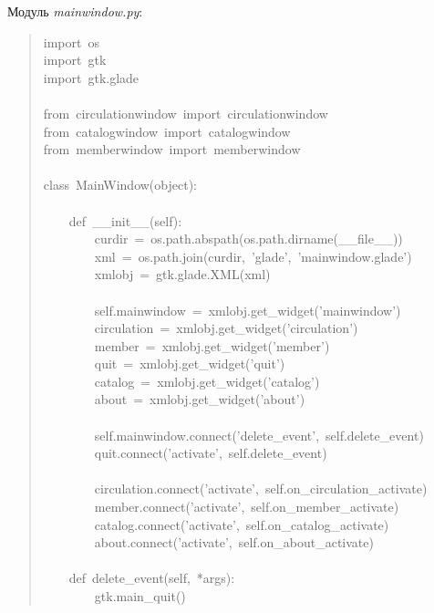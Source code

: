 \documentclass[a4paper,openany,twoside,final]{book}
\providecommand*{\DUroletitlereference}[1]{\textsl{#1}}
\begin{document}
Модуль \DUroletitlereference{mainwindow.py}:

\begin{quote}{\ttfamily \raggedright \noindent
import~os\\
import~gtk\\
import~gtk.glade\\
~\\
from~circulationwindow~import~circulationwindow\\
from~catalogwindow~import~catalogwindow\\
from~memberwindow~import~memberwindow\\
~\\
class~MainWindow(object):\\
~\\
~~~~def~\_\_init\_\_(self):\\
~~~~~~~~curdir~=~os.path.abspath(os.path.dirname(\_\_file\_\_))\\
~~~~~~~~xml~=~os.path.join(curdir,~'glade',~'mainwindow.glade')\\
~~~~~~~~xmlobj~=~gtk.glade.XML(xml)\\
~\\
~~~~~~~~self.mainwindow~=~xmlobj.get\_widget('mainwindow')\\
~~~~~~~~circulation~=~xmlobj.get\_widget('circulation')\\
~~~~~~~~member~=~xmlobj.get\_widget('member')\\
~~~~~~~~quit~=~xmlobj.get\_widget('quit')\\
~~~~~~~~catalog~=~xmlobj.get\_widget('catalog')\\
~~~~~~~~about~=~xmlobj.get\_widget('about')\\
~\\
~~~~~~~~self.mainwindow.connect('delete\_event',~self.delete\_event)\\
~~~~~~~~quit.connect('activate',~self.delete\_event)\\
~\\
~~~~~~~~circulation.connect('activate',~self.on\_circulation\_activate)\\
~~~~~~~~member.connect('activate',~self.on\_member\_activate)\\
~~~~~~~~catalog.connect('activate',~self.on\_catalog\_activate)\\
~~~~~~~~about.connect('activate',~self.on\_about\_activate)\\
~\\
~~~~def~delete\_event(self,~*args):\\
~~~~~~~~gtk.main\_quit()\\
}
\end{quote}
\end{document}
